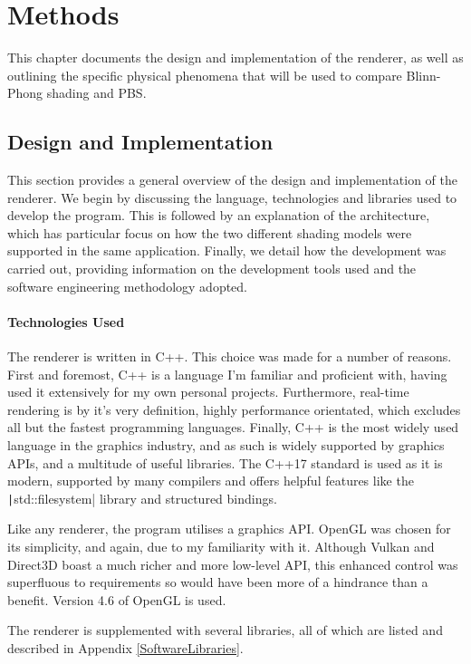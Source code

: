 \chapter{Methods}
\label{chapter2}

This chapter documents the design and implementation of the renderer, as well as outlining the specific physical phenomena that will be used to compare Blinn-Phong shading and PBS.

\section{Design and Implementation}

This section provides a general overview of the design and implementation of the renderer. We begin by discussing the language, technologies and libraries used to develop the program. This is followed by an explanation of the architecture, which has particular focus on how the two different shading models were supported in the same application. Finally, we detail how the development was carried out, providing information on the development tools used and the software engineering methodology adopted.

\subsubsection{Technologies Used}

The renderer is written in C++. This choice was made for a number of reasons. First and foremost, C++ is a language I'm familiar and proficient with, having used it extensively for my own personal projects. Furthermore, real-time rendering is by it's very definition, highly performance orientated, which excludes all but the fastest programming languages. Finally, C++ is the most widely used language in the graphics industry, and as such is widely supported by graphics APIs, and a multitude of useful libraries. The C++17 standard is used as it is modern, supported by many compilers and offers helpful features like the \texttt|std::filesystem| library and structured bindings.

Like any renderer, the program utilises a graphics API. OpenGL was chosen for its simplicity, and again, due to my familiarity with it. Although Vulkan and Direct3D boast a much richer and more low-level API, this enhanced control was superfluous to requirements so would have been more of a hindrance than a benefit. Version 4.6 of OpenGL is used.

The renderer is supplemented with several libraries, all of which are listed and described in Appendix \ref{SoftwareLibraries}.

